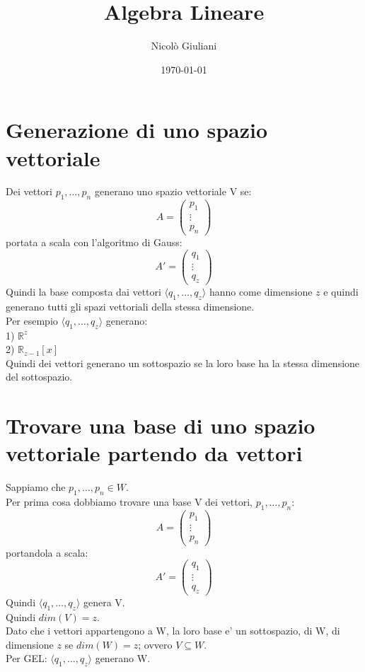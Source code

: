 \documentclass{article}
\title{Algebra Lineare}
\author{Nicolò Giuliani}
\date{\today}
\begin{document}
\section{Generazione di uno spazio vettoriale}
Dei vettori $p_1,\dots,p_n$ generano uno spazio vettoriale V se:
\begin{equation*}
    A=\begin{pmatrix}
        p_1 \\
        \vdots \\
        p_n
    \end{pmatrix}
\end{equation*}
portata a scala con l'algoritmo di Gauss:
\begin{equation*}
    A'=\begin{pmatrix}
        q_1 \\
        \vdots \\
        q_z
    \end{pmatrix}
\end{equation*}
Quindi la base composta  dai vettori $\langle q_1,\dots,q_z\rangle$ hanno come dimensione $z$ e quindi generano tutti gli spazi vettoriali della stessa dimensione. \\
Per esempio $\langle q_1,\dots,q_z\rangle$ generano: \\
1) $\mathbb{R}^z$ \\
2) $\mathbb{R}_{z-1}[x]$ 
\vspace{2em}
\\Quindi dei vettori generano un sottospazio se la loro base ha la stessa dimensione del sottospazio.

\section{Trovare una base di uno spazio vettoriale partendo da vettori}
Sappiamo che $p_1,\dots,p_n \in W$. \\
Per prima cosa dobbiamo trovare una base V dei vettori, $p_1,\dots,p_n$:
\begin{equation*}
    A=\begin{pmatrix}
        p_1 \\
        \vdots \\
        p_n
    \end{pmatrix}
\end{equation*}
portandola a scala:
\begin{equation*}
    A'=\begin{pmatrix}
        q_1 \\
        \vdots \\
        q_z
    \end{pmatrix}
\end{equation*}
Quindi $\langle q_1,\dots,q_z\rangle$ genera V. \\
Quindi $dim(V)=z$. \\
Dato che i vettori appartengono a W, la loro base e' un sottospazio, di W, di dimensione $z$ se $dim(W)=z$; ovvero $V\subseteq W$. \\
Per GEL: $\langle q_1,\dots,q_z\rangle$ generano W.
\end{document}
